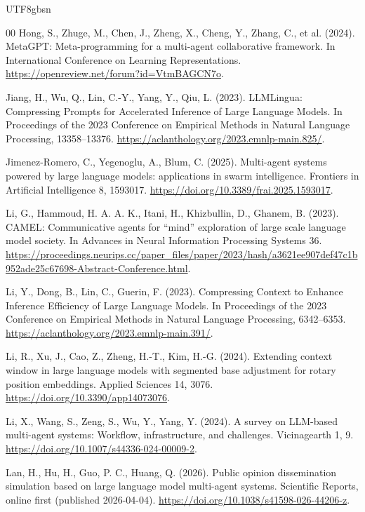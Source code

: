 \documentclass[a4paper,fleqn]{cas-sc}
\begin{document}
\begin{CJK*}{UTF8}{gbsn}
\begin{thebibliography}{00}
Hong, S., Zhuge, M., Chen, J., Zheng, X., Cheng, Y., Zhang, C., et al. (2024). MetaGPT: Meta-programming for a multi-agent collaborative framework. In International Conference on Learning Representations. \url{https://openreview.net/forum?id=VtmBAGCN7o}.

Jiang, H., Wu, Q., Lin, C.-Y., Yang, Y., Qiu, L. (2023). LLMLingua: Compressing Prompts for Accelerated Inference of Large Language Models. In Proceedings of the 2023 Conference on Empirical Methods in Natural Language Processing, 13358--13376. \url{https://aclanthology.org/2023.emnlp-main.825/}.

Jimenez-Romero, C., Yegenoglu, A., Blum, C. (2025). Multi-agent systems powered by large language models: applications in swarm intelligence. Frontiers in Artificial Intelligence 8, 1593017. \url{https://doi.org/10.3389/frai.2025.1593017}.

Li, G., Hammoud, H. A. A. K., Itani, H., Khizbullin, D., Ghanem, B. (2023). CAMEL: Communicative agents for ``mind'' exploration of large scale language model society. In Advances in Neural Information Processing Systems 36. \url{https://proceedings.neurips.cc/paper_files/paper/2023/hash/a3621ee907def47c1b952ade25c67698-Abstract-Conference.html}.

Li, Y., Dong, B., Lin, C., Guerin, F. (2023). Compressing Context to Enhance Inference Efficiency of Large Language Models. In Proceedings of the 2023 Conference on Empirical Methods in Natural Language Processing, 6342--6353. \url{https://aclanthology.org/2023.emnlp-main.391/}.

Li, R., Xu, J., Cao, Z., Zheng, H.-T., Kim, H.-G. (2024). Extending context window in large language models with segmented base adjustment for rotary position embeddings. Applied Sciences 14, 3076. \url{https://doi.org/10.3390/app14073076}.

Li, X., Wang, S., Zeng, S., Wu, Y., Yang, Y. (2024). A survey on LLM-based multi-agent systems: Workflow, infrastructure, and challenges. Vicinagearth 1, 9. \url{https://doi.org/10.1007/s44336-024-00009-2}.

Lan, H., Hu, H., Guo, P. C., Huang, Q. (2026). Public opinion dissemination simulation based on large language model multi-agent systems. Scientific Reports, online first (published 2026-04-04). \url{https://doi.org/10.1038/s41598-026-44206-z}.


\end{thebibliography}
\end{CJK*}
\end{document}
